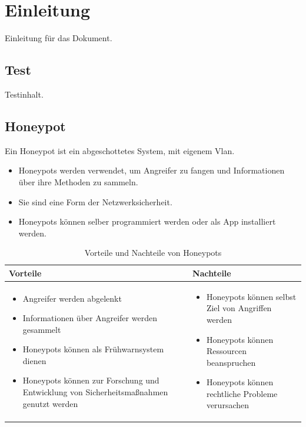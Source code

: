 \documentclass{article}
\begin{document}
\tableofcontents
\newpage
\section{Einleitung}
Einleitung für das Dokument.
\subsection{Test}
Testinhalt.
\subsection{Honeypot}
Ein Honeypot ist ein abgeschottetes System, mit eigenem Vlan.

\begin{itemize}
\item Honeypots werden verwendet, um Angreifer zu fangen und Informationen über ihre Methoden zu sammeln.
\item Sie sind eine Form der Netzwerksicherheit.
\item Honeypots können selber programmiert werden oder als App installiert werden.
\end{itemize}
\begin{table}[htbp]
\centering
\begin{tabular}{|p{}|p{}|}
\hline
\textbf{Vorteile} & \textbf{Nachteile} \\
\hline
\begin{itemize}
  \item Angreifer werden abgelenkt
  \item Informationen über Angreifer werden gesammelt
  \item Honeypots können als Frühwarnsystem dienen
  \item Honeypots können zur Forschung und Entwicklung von Sicherheitsmaßnahmen genutzt werden
\end{itemize}
&
\begin{itemize}
  \item Honeypots können selbst Ziel von Angriffen werden
  \item Honeypots können Ressourcen beanspruchen
  \item Honeypots können rechtliche Probleme verursachen
\end{itemize} \\
\hline
\end{tabular}
\caption{Vorteile und Nachteile von Honeypots}
\label{tab:honeypot-vor-nachteile}
\end{table}
\end{document}
